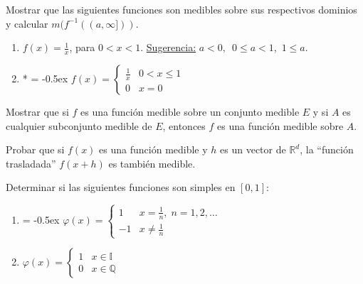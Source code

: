 \documentclass{book}
\newcommand{\rr}{\mathbb{R}}
\newcommand{\qq}{\mathbb{Q}}
\newcommand{\ii}{\mathbb{I}}
\begin{document}
\begin{ejer}{} 
Mostrar que las siguientes funciones son medibles sobre sus respectivos dominios y calcular 
$m(f^{-1}((a,\infty]))$.
\begin{enumerate}
\item  $f(x)=\frac{1}{x}$, para $0<x<1$. \;\;
\underline{Sugerencia:} $a<0,$\, $0\leq a<1$,\, $1\leq a$.
\item* 
{
\extrarowheight = -0.5ex
\renewcommand{\arraystretch}{1.8}
$f(x)=\left\{
\begin{array}{ll}
\frac{1}{x}&0<x\leq 1
\\
0&x=0
\end{array}
\right.$}
\end{enumerate}
\end{ejer}


\begin{ejer}{} 
Mostrar que si $f$ es una funci\'on  medible sobre un conjunto medible $E$ y si $A$ es cualquier subconjunto medible de $E$, entonces $f$ es una funci\'on medible sobre $A$.
\end{ejer}




\begin{ejer}{} 
Probar que si $f(x)$ es una función medible y $h$ es un vector de $\rr^d$, la ``función 
trasladada'' $f(x+h)$ es también medible.
\end{ejer}



\begin{ejer}{} 
Determinar si las siguientes funciones son simples en $[0,1]$:
\begin{enumerate}
\item 
{
\extrarowheight = -0.5ex
\renewcommand{\arraystretch}{1.8}
$\varphi(x)=
\left\{
\begin{array}{rl}
1& x=\frac{1}{n},\;n=1,2,\dots
\\
-1&x\neq \frac{1}{n}
\end{array}
\right.
$}
\item 
$\varphi(x)=
\left\{
\begin{array}{ll}
1& x \in \ii
\\
0&x\in \qq
\end{array}
\right.
$
\end{enumerate}
\end{ejer}
\end{document}

